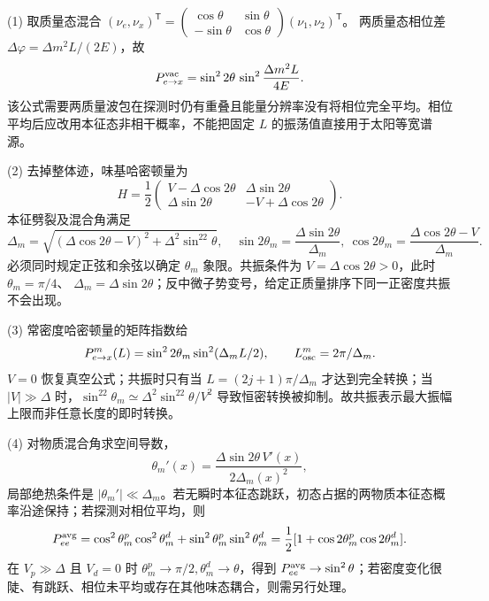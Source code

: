 (1) 取质量态混合
\((\nu_e,\nu_x)^\mathsf T=
\begin{pmatrix}\cos\theta&\sin\theta\\-\sin\theta&\cos\theta\end{pmatrix}
(\nu_1,\nu_2)^\mathsf T\)。
两质量态相位差 \(\Delta\varphi=\Delta m^2L/(2E)\)，故
\[
P_{e\to x}^{\rm vac}=\sin^22\theta\,
\sin^2\frac{\Delta m^2L}{4E}.
\]
该公式需要两质量波包在探测时仍有重叠且能量分辨率没有将相位完全平均。相位平均后应改用本征态非相干概率，不能把固定 \(L\) 的振荡值直接用于太阳等宽谱源。

(2) 去掉整体迹，味基哈密顿量为
\[
H=\frac12\begin{pmatrix}
V-\Delta\cos2\theta & \Delta\sin2\theta\\
\Delta\sin2\theta &-V+\Delta\cos2\theta
\end{pmatrix}.
\]
本征劈裂及混合角满足
\[
\Delta_m=\sqrt{(\Delta\cos2\theta-V)^2+\Delta^2\sin^22\theta},
\quad\sin2\theta_m=\frac{\Delta\sin2\theta}{\Delta_m},\
\cos2\theta_m=\frac{\Delta\cos2\theta-V}{\Delta_m}.
\]
必须同时规定正弦和余弦以确定 \(\theta_m\) 象限。共振条件为
\(V=\Delta\cos2\theta>0\)，此时 \(\theta_m=\pi/4\)、
\(\Delta_m=\Delta\sin2\theta\)；反中微子势变号，给定正质量排序下同一正密度共振不会出现。

(3) 常密度哈密顿量的矩阵指数给
\[
P_{e\to x}^{m}(L)=\sin^22\theta_m\sin^2(\Delta_m L/2),\qquad
L_{\rm osc}^{m}=2\pi/\Delta_m.
\]
\(V=0\) 恢复真空公式；共振时只有当
\(L=(2j+1)\pi/\Delta_m\) 才达到完全转换；当
\(|V|\gg\Delta\) 时，\(\sin^22\theta_m\simeq\Delta^2\sin^22\theta/V^2\) 导致恒密转换被抑制。故共振表示最大振幅上限而非任意长度的即时转换。

(4) 对物质混合角求空间导数，
\[
\theta_m'(x)=\frac{\Delta\sin2\theta\,V'(x)}{2\Delta_m(x)^2},
\]
局部绝热条件是 \(|\theta_m'|\ll\Delta_m\)。若无瞬时本征态跳跃，初态占据的两物质本征态概率沿途保持；若探测对相位平均，则
\[
P_{ee}^{\rm avg}=
\cos^2\theta_m^p\cos^2\theta_m^d+
\sin^2\theta_m^p\sin^2\theta_m^d
=\frac12[1+\cos2\theta_m^p\cos2\theta_m^d].
\]
在 \(V_p\gg\Delta\) 且 \(V_d=0\) 时
\(\theta_m^p\to\pi/2,\theta_m^d\to\theta\)，得到
\(P_{ee}^{\rm avg}\to\sin^2\theta\)；若密度变化很陡、有跳跃、相位未平均或存在其他味态耦合，则需另行处理。

